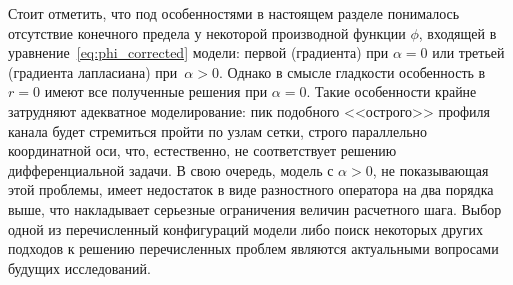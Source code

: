 Стоит отметить, что под особенностями в настоящем разделе понималось отсутствие конечного предела у некоторой производной функции $\phi$, входящей в уравнение~\eqref{eq:phi_corrected} модели: первой (градиента) при $\alpha = 0$ или третьей (градиента лапласиана) при~$\alpha > 0$. Однако в смысле гладкости особенность в $r = 0$ имеют все полученные решения при $\alpha = 0$. Такие особенности крайне затрудняют адекватное моделирование: пик подобного <<острого>> профиля канала будет стремиться пройти по узлам сетки, строго параллельно координатной оси, что, естественно, не соответствует решению дифференциальной задачи. В свою очередь, модель с $\alpha > 0$, не показывающая этой проблемы, имеет недостаток в виде разностного оператора на два порядка выше, что накладывает серьезные ограничения величин расчетного шага. Выбор одной из перечисленный конфигураций модели либо поиск некоторых других подходов к решению перечисленных проблем являются актуальными вопросами будущих исследований.